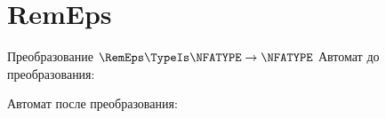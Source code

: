 \section{RemEps}
\begin{frame}{Преобразование $\RemEps\TypeIs\NFATYPE\to\NFATYPE$}
	Автомат до преобразования:


	Автомат после преобразования:


\end{frame}
